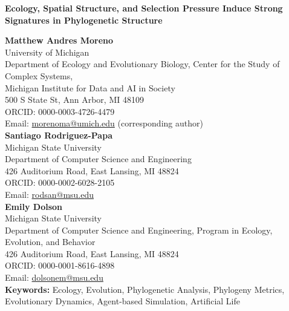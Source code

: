 \thispagestyle{empty}  %

\begin{center}
    {\Large\bf Ecology, Spatial Structure, and Selection Pressure Induce Strong Signatures in Phylogenetic Structure}\vspace{0.5cm}

    {\large\bf Matthew Andres Moreno}\\[0.5em]
    University of Michigan\\
    Department of Ecology and Evolutionary Biology, Center for the Study of Complex Systems,\\
    Michigan Institute for Data and AI in Society\\
    500 S State St, Ann Arbor, MI 48109\\
    ORCID: 0000-0003-4726-4479\\
    Email: \href{mailto:morenoma@umich.edu}{morenoma@umich.edu} (corresponding author)\\[1.5em]

    {\large\bf Santiago Rodriguez-Papa}\\[0.5em]
    Michigan State University\\
    Department of Computer Science and Engineering\\
    426 Auditorium Road, East Lansing, MI 48824\\
    ORCID: 0000-0002-6028-2105\\
    Email: \href{mailto:rodsan@msu.edu}{rodsan@msu.edu}\\[1.5em]

    {\large\bf Emily Dolson}\\[0.5em]
    Michigan State University\\
    Department of Computer Science and Engineering, Program in Ecology, Evolution, and Behavior\\
    426 Auditorium Road, East Lansing, MI 48824\\
    ORCID: 0000-0001-8616-4898\\
    Email: \href{mailto:dolsonem@msu.edu}{dolsonem@msu.edu}\\[0.5cm]

    

    \textbf{Keywords:} Ecology, Evolution, Phylogenetic Analysis, Phylogeny Metrics, Evolutionary Dynamics, Agent-based Simulation, Artificial Life

    \vfill
\end{center}

~
\clearpage
\newpage